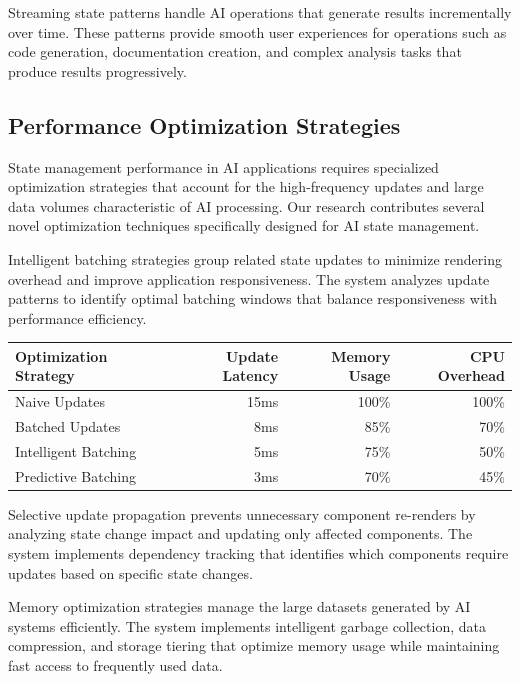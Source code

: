 Streaming state patterns handle AI operations that generate results incrementally over time. These patterns provide smooth user experiences for operations such as code generation, documentation creation, and complex analysis tasks that produce results progressively.

\subsection*{Performance Optimization Strategies}

State management performance in AI applications requires specialized optimization strategies that account for the high-frequency updates and large data volumes characteristic of AI processing. Our research contributes several novel optimization techniques specifically designed for AI state management.

Intelligent batching strategies group related state updates to minimize rendering overhead and improve application responsiveness. The system analyzes update patterns to identify optimal batching windows that balance responsiveness with performance efficiency.

\begin{center}
\begin{tabular}{@{}lrrr@{}}
\toprule
\textbf{Optimization Strategy} & \textbf{Update Latency} & \textbf{Memory Usage} & \textbf{CPU Overhead} \\
\midrule
Naive Updates & 15ms & 100\% & 100\% \\
Batched Updates & 8ms & 85\% & 70\% \\
Intelligent Batching & 5ms & 75\% & 50\% \\
Predictive Batching & 3ms & 70\% & 45\% \\
\bottomrule
\end{tabular}
\end{center}

Selective update propagation prevents unnecessary component re-renders by analyzing state change impact and updating only affected components. The system implements dependency tracking that identifies which components require updates based on specific state changes.

Memory optimization strategies manage the large datasets generated by AI systems efficiently. The system implements intelligent garbage collection, data compression, and storage tiering that optimize memory usage while maintaining fast access to frequently used data.

